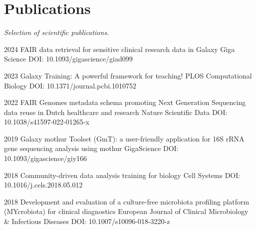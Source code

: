 \documentclass[]{shiltemann-cv}
\begin{document}
\section{Publications}
\emph{Selection of scientific publications.}

\begin{entrylist}

\entry
  {2024}
  {FAIR data retrieval for sensitive clinical research data in Galaxy }
  {Giga Science}
  {DOI: 10.1093/gigascience/giad099}

\end{entrylist}
\begin{entrylist}

\entry
  {2023}
  {Galaxy Training: A powerful framework for teaching!}
  {PLOS Computational Biology}
  {DOI: 10.1371/journal.pcbi.1010752 }

\end{entrylist}

\begin{entrylist}

\entry
  {2022}
  {FAIR Genomes metadata schema promoting Next Generation Sequencing data reuse in Dutch healthcare and research}
  {Nature Scientific Data}
  {DOI: 10.1038/s41597-022-01265-x}
\end{entrylist}



\begin{entrylist}

\entry
  {2019}
  {Galaxy mothur Toolset (GmT): a user-friendly application for 16S rRNA gene sequencing analysis using mothur}
  {GigaScience}
  {DOI: 10.1093/gigascience/giy166}

\end{entrylist}

\begin{entrylist}
\entry
 {2018}
 {Community-driven data analysis training for biology}
 {Cell Systems}
 {DOI: 10.1016/j.cels.2018.05.012}
\end{entrylist}

\begin{entrylist}
\entry
  {2018}
  {Development and evaluation of a culture-free microbiota profiling platform (MYcrobiota) for clinical diagnostics}
  {European Journal of Clinical Microbiology \& Infectious Diseases}
  {DOI: 10.1007/s10096-018-3220-z}
\end{entrylist}
\end{document}
